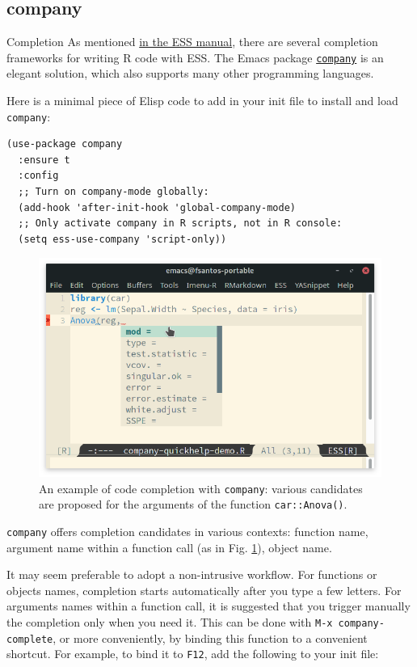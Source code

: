 \documentclass[presentation]{beamer}
\begin{document}
\subsection{company}
\label{sec:orga60a6f9}
\begin{frame}[fragile,allowframebreaks,label=]{Completion}
 As mentioned \href{https://ess.r-project.org/Manual/ess.html\#Completion}{in the ESS manual}, there are several completion frameworks for writing R code with ESS. The Emacs package \href{https://company-mode.github.io/}{\texttt{company}} is an elegant solution, which also supports many other programming languages.

Here is a minimal piece of Elisp code to add in your init file to install and load \texttt{company}:

\begin{verbatim}
(use-package company
  :ensure t
  :config
  ;; Turn on company-mode globally:
  (add-hook 'after-init-hook 'global-company-mode)
  ;; Only activate company in R scripts, not in R console:
  (setq ess-use-company 'script-only))
\end{verbatim}

\begin{figure}[htbp]
\centering
\includegraphics[width=0.72 \textwidth]{./images/company.png}
\caption{\label{fig:org2f8565b}An example of code completion with \texttt{company}: various candidates are proposed for the arguments of the function \texttt{car::Anova()}.}
\end{figure}

\texttt{company} offers completion candidates in various contexts: function name, argument name within a function call (as in Fig. \ref{fig:org2f8565b}), object name.

It may seem preferable to adopt a non-intrusive workflow. For functions or objects names, completion starts automatically after you type a few letters. For arguments names within a function call, it is suggested that you trigger manually the completion only when you need it. This can be done with \texttt{M-x company-complete}, or more conveniently, by binding this function to a convenient shortcut. For example, to bind it to \texttt{F12}, add the following to your init file:


\end{frame}
\end{document}
